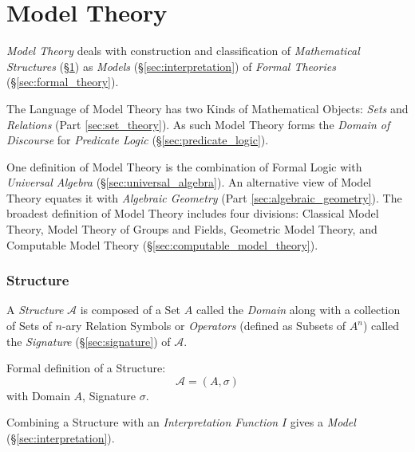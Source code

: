 \part{Model Theory}\label{sec:model_theory}\cite{hodges97}

\emph{Model Theory} deals with construction and classification of
\emph{Mathematical Structures} (\S\ref{sec:structure}) as
\emph{Models} (\S\ref{sec:interpretation}) of \emph{Formal Theories}
(\S\ref{sec:formal_theory}).

The Language of Model Theory has two Kinds of Mathematical Objects:
\emph{Sets} and \emph{Relations} (Part \ref{sec:set_theory}). As such
Model Theory forms the \emph{Domain of Discourse} for \emph{Predicate
  Logic} (\S\ref{sec:predicate_logic}).

One definition of Model Theory is the combination of Formal Logic with
\emph{Universal Algebra} (\S\ref{sec:universal_algebra}). An
alternative view of Model Theory equates it with \emph{Algebraic
  Geometry} (Part \ref{sec:algebraic_geometry}). The broadest
definition of Model Theory includes four divisions: Classical Model
Theory, Model Theory of Groups and Fields, Geometric Model Theory, and
Computable Model Theory (\S\ref{sec:computable_model_theory}).



\section{Structure}\label{sec:structure}

A \emph{Structure} $\mathcal{A}$ is composed of a Set $A$ called the
\emph{Domain} along with a collection of Sets of $n$-ary Relation
Symbols or \emph{Operators} (defined as Subsets of $A^n$) called the
\emph{Signature} (\S\ref{sec:signature}) of $\mathcal{A}$.

Formal definition of a Structure:
\[
    \mathcal{A} = (A, \sigma)
\]
with Domain $A$, Signature $\sigma$.

Combining a Structure with an \emph{Interpretation Function} $I$ gives
a \emph{Model} (\S\ref{sec:interpretation}).



